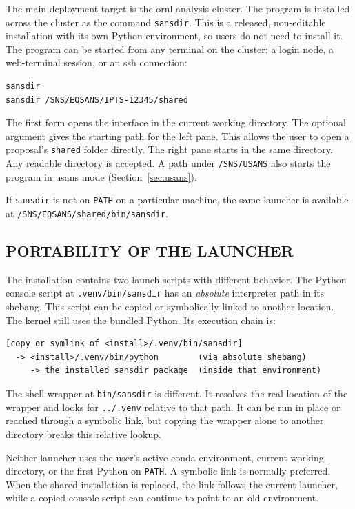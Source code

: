 \documentclass[tm]{ornltm}
\begin{document}
The main deployment target is the \ac{ornl} analysis cluster. The program is
installed across the cluster as the command \texttt{sansdir}. This is a
released, non-editable installation with its own Python environment, so users do
not need to install it. The program can be started from any terminal on the
cluster: a login node, a web-terminal session, or an \ac{ssh} connection:

\begin{lstlisting}[language=shellsession]
sansdir
sansdir /SNS/EQSANS/IPTS-12345/shared
\end{lstlisting}

The first form opens the interface in the current working directory. The
optional argument gives the starting path for the left pane. This allows the
user to open a proposal's \texttt{shared} folder directly. The right pane starts
in the same directory. Any readable directory is accepted. A path under
\texttt{/SNS/USANS} also starts the program in \ac{usans} mode
(Section~\ref{sec:usans}).

If \texttt{sansdir} is not on \texttt{PATH} on a particular machine, the same
launcher is available at \texttt{/SNS/EQSANS/shared/bin/sansdir}.

\subsection{PORTABILITY OF THE LAUNCHER}

The installation contains two launch scripts with different behavior. The
Python console script at \texttt{.venv/bin/sansdir} has an \emph{absolute}
interpreter path in its shebang. This script can be copied or symbolically linked
to another location. The kernel still uses the bundled Python. Its execution
chain is:

\begin{lstlisting}
[copy or symlink of <install>/.venv/bin/sansdir]
  -> <install>/.venv/bin/python        (via absolute shebang)
     -> the installed sansdir package  (inside that environment)
\end{lstlisting}

The shell wrapper at \texttt{bin/sansdir} is different. It resolves the real
location of the wrapper and looks for \texttt{../.venv} relative to that path.
It can be run in place or reached through a symbolic link, but copying the
wrapper alone to another directory breaks this relative lookup.

Neither launcher uses the user's active conda environment, current working
directory, or the first Python on \texttt{PATH}. A symbolic link is normally
preferred. When the shared installation is replaced, the link follows the
current launcher, while a copied console script can continue to point to an old
environment.
\end{document}

